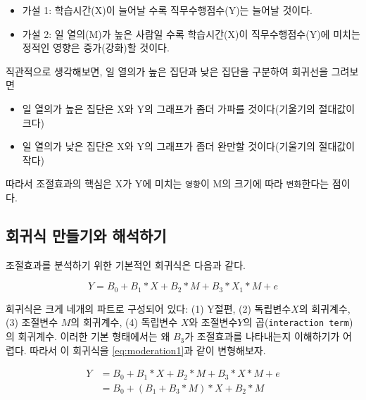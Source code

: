 \documentclass[
]{book}
\providecommand{\tightlist}{%
  \setlength{\itemsep}{0pt}\setlength{\parskip}{0pt}}
\begin{document}
\begin{itemize}
\tightlist
\item
  가설 1: 학습시간(X)이 늘어날 수록 직무수행점수(Y)는 늘어날 것이다.
\item
  가설 2: 일 열의(M)가 높은 사람일 수록 학습시간(X)이 직무수행점수(Y)에 미치는 정적인 영향은 증가(강화)할 것이다.
\end{itemize}

직관적으로 생각해보면, 일 열의가 높은 집단과 낮은 집단을 구분하여 회귀선을 그려보면

\begin{itemize}
\tightlist
\item
  일 열의가 높은 집단은 X와 Y의 그래프가 좀더 가파를 것이다(기울기의 절대값이 크다)
\item
  일 열의가 낮은 집단은 X와 Y의 그래프가 좀더 완만할 것이다(기울기의 절대값이 작다)
\end{itemize}

따라서 조절효과의 핵심은 X가 Y에 미치는 \texttt{영향}이 M의 크기에 따라 \texttt{변화}한다는 점이다.

\subsection{회귀식 만들기와 해석하기}\label{uxd68cuxadc0uxc2dd-uxb9ccuxb4e4uxae30uxc640-uxd574uxc11duxd558uxae30}

조절효과를 분석하기 위한 기본적인 회귀식은 다음과 같다.

\begin{equation}
Y= B_{0}+B_{1} \ast X+ B_{2} \ast M + B_{3} \ast X_{1} \ast M + e 
\label{eq:moderation}
\end{equation}

회귀식은 크게 네개의 파트로 구성되어 있다: (1) Y절편, (2) 독립변수\(X\)의 회귀계수, (3) 조절변수 \(M\)의 회귀계수, (4) 독립변수 \(X\)와 조절변수\(Y\)의 곱(\texttt{interaction\ term}) 의 회귀계수. 이러한 기본 형태에서는 왜 \(B_{3}\)가 조절효과를 나타내는지 이해하기가 어렵다. 따라서 이 회귀식을 \eqref{eq:moderation1}과 같이 변형해보자.

\begin{equation}
\begin{split}
Y & = B_{0}+B_{1} \ast X+ B_{2} \ast M + B_{3} \ast X \ast M + e\\
& = B_{0} +(B_{1}+B_{3}\ast M) \ast X + B_2 \ast M\\
\end{split}
\label{eq:moderation1}
\end{equation}
\end{document}
